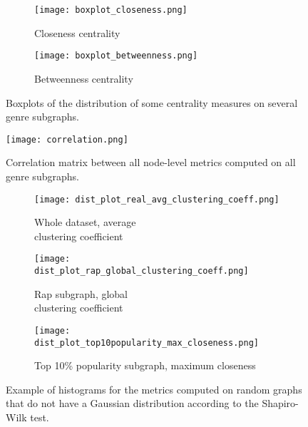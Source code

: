 \begin{figure*}[]
  \centering
  \begin{subfigure}{.45\textwidth}
    \centering
    \captionsetup{justification=centering}
    \texttt{[image: boxplot\_closeness.png]}  %
    \caption{Closeness centrality}
  \end{subfigure}
  \begin{subfigure}{.45\textwidth}
    \centering
    \captionsetup{justification=centering}
    \texttt{[image: boxplot\_betweenness.png]}  %
    \caption{Betweenness centrality}
    \label{fig:between}
  \end{subfigure}
  \caption{Boxplots of the distribution of some centrality measures on several genre subgraphs.}
  \label{fig:boxplot}
\end{figure*}

\begin{figure*}[]
    \centering
    \captionsetup{justification=centering}
    \texttt{[image: correlation.png]}  %
    \caption{Correlation matrix between all node-level metrics computed on all genre subgraphs.}
    \label{fig:correlation}
\end{figure*}

\begin{figure*}[]
    \centering
    \begin{subfigure}{.33\textwidth}
      \centering
      \captionsetup{justification=centering}
      \texttt{[image: dist\_plot\_real\_avg\_clustering\_coeff.png]}
      \caption{Whole dataset, average \\ clustering coefficient}
      \label{fig:hist1}
    \end{subfigure}%
    \begin{subfigure}{.33\textwidth}
      \centering
      \captionsetup{justification=centering}
      \texttt{[image: dist\_plot\_rap\_global\_clustering\_coeff.png]}
      \caption{Rap subgraph, global \\ clustering coefficient}
      \label{fig:hist2}
    \end{subfigure}
    \begin{subfigure}{.33\textwidth}
      \centering
      \captionsetup{justification=centering}
      \texttt{[image: dist\_plot\_top10popularity\_max\_closeness.png]}
      \caption{Top 10\% popularity subgraph, maximum closeness}
      \label{fig:hist3}
    \end{subfigure}
    \caption{Example of histograms for the metrics computed on random graphs that do not have a Gaussian distribution according to the Shapiro-Wilk test.}
    \label{fig:hist}
\end{figure*}